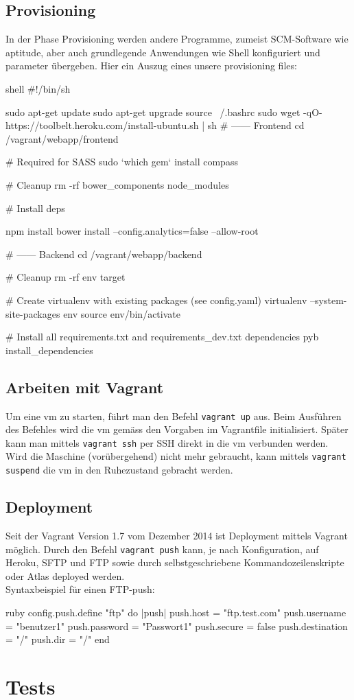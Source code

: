 \subsection{Provisioning}
In der Phase Provisioning werden andere Programme, zumeist SCM-Software wie aptitude, aber auch grundlegende Anwendungen wie Shell konfiguriert und parameter übergeben.
Hier ein Auszug eines unsere provisioning files:
\begin{src}{shell}
#!/bin/sh

sudo apt-get update
sudo apt-get upgrade
source ~/.bashrc
sudo wget -qO- https://toolbelt.heroku.com/install-ubuntu.sh | sh
# ------ Frontend
cd /vagrant/webapp/frontend

# Required for SASS
sudo `which gem` install compass

# Cleanup
rm -rf bower_components node_modules

# Install deps

npm install
bower install --config.analytics=false --allow-root


# ------ Backend
cd /vagrant/webapp/backend

# Cleanup
rm -rf env target

# Create virtualenv with existing packages (see config.yaml)
virtualenv --system-site-packages env
source env/bin/activate

# Install all requirements.txt and requirements_dev.txt dependencies
pyb install_dependencies

\end{src}
\subsection{Arbeiten mit Vagrant}
Um eine \gls{vm} zu starten, führt man den Befehl \texttt{vagrant up} aus. Beim Ausführen des Befehles wird die \gls{vm} gemäss den Vorgaben im Vagrantfile initialisiert. Später kann man mittels \texttt{vagrant ssh} per SSH direkt in die \gls{vm} verbunden werden. Wird die Maschine (vorübergehend) nicht mehr gebraucht, kann mittels \texttt{vagrant suspend} die \gls{vm} in den Ruhezustand gebracht werden.
\subsection{Deployment}
Seit der Vagrant Version 1.7 vom Dezember 2014 ist Deployment mittels Vagrant möglich. Durch den Befehl \texttt{vagrant push} kann, je nach Konfiguration, auf Heroku, SFTP und FTP sowie durch selbstgeschriebene Kommandozeilenskripte oder Atlas deployed werden.
\\Syntaxbeispiel für einen FTP-push: \cite{vagrant-deployment}
\begin{src}{ruby}
config.push.define "ftp" do |push|
  push.host = "ftp.test.com"
  push.username = "benutzer1"
  push.password = "Passwort1"
  push.secure = false
  push.destination = "/"
  push.dir = "/"
end
\end{src}
\section{Tests}